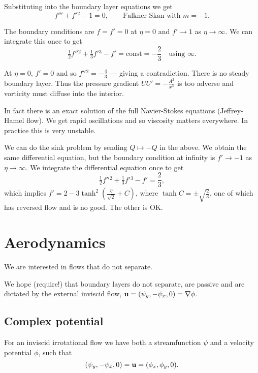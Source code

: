\documentclass{notes}
\theoremstyle{plain}
\begin{document}
Substituting into the boundary layer equations we get
\[
f''' + f'{}^2 - 1 = 0, \qquad \text{Falkner-Skan with $m = -1$.}
\]

The boundary conditions are $f = f' = 0$ at $\eta = 0$ and $f' \to 1$
as $\eta \to \infty$.  We can integrate this once to get
\[
\tfrac{1}{2} f''{}^2 + \tfrac{1}{3} f'{}^3 - f' = \text{const}
= -\frac{2}{3} \quad \text{using $\infty$.}
\]

At $\eta = 0$, $f' = 0$ and so $f''{}^2 = -\frac{4}{3}$ --- giving a
contradiction.  There is no steady boundary layer.  Thus the pressure
gradient $U U' = -\frac{A^2}{x^3}$ is too adverse and vorticity must
diffuse into the interior.

In fact there is an exact solution of the full Navier-Stokes equations
(Jeffrey-Hamel flow).  We get rapid oscillations and so viscosity matters
everywhere.  In practice this is very unstable.

\vspace{1in}

We can do the sink problem by sending $Q \mapsto -Q$ in the above.
We obtain the same differential equation, but the boundary condition at
infinity is $f' \to -1$ as $\eta \to \infty$.  We integrate the
differential equation once to get
\[
\tfrac{1}{2} f''{}^2 + \tfrac{1}{3} f'{}^3 - f' = \frac{2}{3},
\]
which implies $f' = 2 - 3 \tanh^2 \left( \frac{\eta}{\sqrt{2}} + C \right)$,
where $\tanh C = \pm \sqrt{\frac{2}{3}}$, one of which has reversed flow
and is no good.  The other is OK.

\chapter{Aerodynamics}

We are interested in flows that do not separate.

\vspace{1in}

We hope (require!) that boundary layers do not separate, are passive and
are dictated by the external inviscid flow, $\mathbf{u} = (\psi_y,-\psi_x,0)
= \nabla \phi$.

\section{Complex potential}

For an inviscid irrotational flow we have both a streamfunction
$\psi$ and a velocity potential $\phi$, such that
\[
(\psi_y, -\psi_x,0) = \mathbf{u} = (\phi_x,\phi_y,0).
\]
\end{document}
